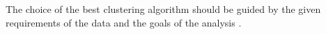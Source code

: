 The choice of the best clustering algorithm should be guided by the given requirements of the data and the goals of the analysis \cite{COL-ALT}.






